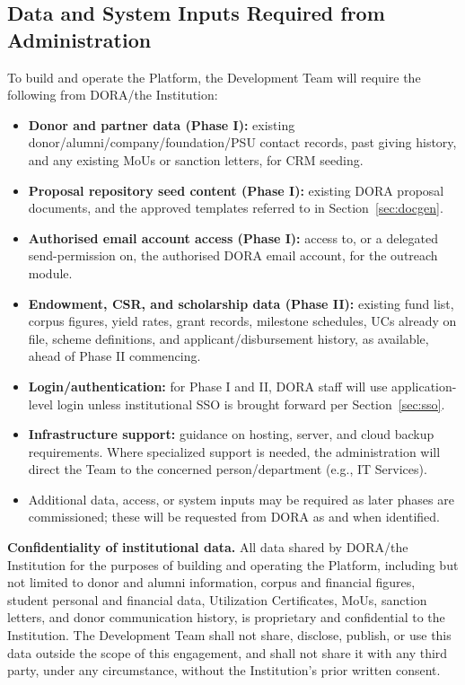 \documentclass[11pt]{article}
\begin{document}
\subsection{Data and System Inputs Required from Administration}
To build and operate the Platform, the Development Team will require the following from DORA/the Institution:
\begin{itemize}[leftmargin=1.4em, itemsep=3pt]
\item \textbf{Donor and partner data (Phase I):} existing donor/alumni/company/foundation/PSU contact records, past giving history, and any existing MoUs or sanction letters, for CRM seeding.
\item \textbf{Proposal repository seed content (Phase I):} existing DORA proposal documents, and the approved templates referred to in Section~\ref{sec:docgen}.
\item \textbf{Authorised email account access (Phase I):} access to, or a delegated send-permission on, the authorised DORA email account, for the outreach module.
\item \textbf{Endowment, CSR, and scholarship data (Phase II):} existing fund list, corpus figures, yield rates, grant records, milestone schedules, UCs already on file, scheme definitions, and applicant/disbursement history, as available, ahead of Phase II commencing.
\item \textbf{Login/authentication:} for Phase I and II, DORA staff will use application-level login unless institutional SSO is brought forward per Section~\ref{sec:sso}.
\item \textbf{Infrastructure support:} guidance on hosting, server, and cloud backup requirements. Where specialized support is needed, the administration will direct the Team to the concerned person/department (e.g., IT Services).
\item Additional data, access, or system inputs may be required as later phases are commissioned; these will be requested from DORA as and when identified.
\end{itemize}

\textbf{Confidentiality of institutional data.} All data shared by DORA/the Institution for the purposes of building and operating the Platform, including but not limited to donor and alumni information, corpus and financial figures, student personal and financial data, Utilization Certificates, MoUs, sanction letters, and donor communication history, is proprietary and confidential to the Institution. The Development Team shall not share, disclose, publish, or use this data outside the scope of this engagement, and shall not share it with any third party, under any circumstance, without the Institution's prior written consent.
\end{document}
